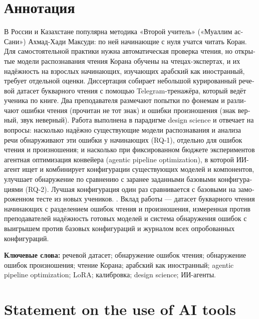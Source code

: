 \chapter*{\textrussian{Аннотация}}
\thispagestyle{plain}
\begin{otherlanguage}{russian}

В России и Казахстане популярна методика «Второй учитель» («Муаллим ас-Сани») Ахмад-Хади Максуди: по ней
начинающие с нуля учатся читать Коран. Для самостоятельной практики нужна автоматическая проверка чтения, но
открытые модели распознавания чтения Корана обучены на чтецах-экспертах, и их надёжность на взрослых
начинающих, изучающих арабский как иностранный, требует отдельной оценки. Диссертация собирает небольшой
курированный речевой датасет букварного чтения с помощью Telegram-тренажёра, который ведёт ученика по книге. Два преподавателя размечают попытки по фонемам и различают ошибки чтения
(прочитан не тот знак) и ошибки произношения (знак верный, звук неверный). Работа выполнена в парадигме
design science и отвечает на вопросы: насколько надёжно существующие модели распознавания и анализа речи
обнаруживают эти ошибки у начинающих (RQ-1), отдельно для ошибок чтения и произношения; и насколько при
фиксированном бюджете экспериментов агентная оптимизация конвейера (agentic pipeline optimization), в которой
ИИ-агент ищет и комбинирует конфигурации существующих моделей и компонентов, улучшает обнаружение по сравнению
с заранее заданными базовыми конфигурациями (RQ-2). Лучшая конфигурация один раз сравнивается с базовыми на
замороженном тесте из новых учеников. . Вклад работы --- датасет букварного чтения начинающих с разделением ошибок
чтения и произношения, измеренная против преподавателей надёжность готовых моделей и система обнаружения
ошибок с выигрышем против базовых конфигураций и журналом всех опробованных конфигураций.

\medskip
\noindent\textbf{Ключевые слова:} речевой датасет; обнаружение ошибок чтения; обнаружение ошибок
произношения; чтение Корана; арабский как иностранный; agentic pipeline optimization; LoRA; калибровка;
design science; ИИ-агенты.
\end{otherlanguage}

\chapter*{Statement on the use of AI tools}
\thispagestyle{plain}

